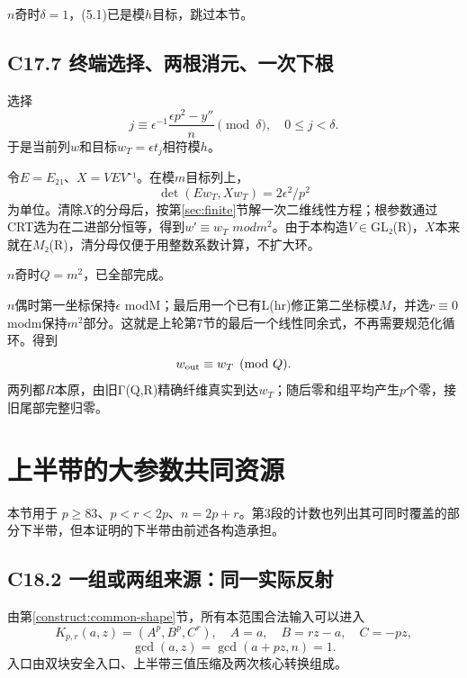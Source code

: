 {\ensuremath{n}奇时\ensuremath{\delta =1}，(5.1)已是模\ensuremath{h}目标，跳过本节。}

\subsection*{\texorpdfstring{{C17.7} {终端选择、两根消元、一次下根}}{C17.7 终端选择、两根消元、一次下根}}\label{C17-h129}

{选择} \[
j\equiv\epsilon^{-1}\frac{\epsilon p^2-y''}{n}\pmod\delta,
\quad0\le j<\delta.
\] {于是当前列\ensuremath{w}和目标\ensuremath{w_{T}=\epsilon t_{j}}相符模\ensuremath{h}。}

{令\ensuremath{E=E}₂₁、\ensuremath{X=VEV}⁻¹。在模\ensuremath{m}目标列上，} \[
\det(Ew_T,Xw_T)=2\epsilon^2/p^2
\] {为单位。清除\ensuremath{X}的分母后，按}第\ref{sec:finite}节{解一次二维线性方程；根参数通过CRT选为在二进部分恒等，得到\ensuremath{w}′\ensuremath{\equiv}\ensuremath{w_{T}}} {\ensuremath{modm^{2}}。由于本构造\ensuremath{V}\ensuremath{\in}GL₂(R)，\ensuremath{X}本来就在\ensuremath{M}₂(R)，清分母仅便于用整数系数计算，不扩大环。}

{\ensuremath{n}奇时\ensuremath{Q=m^{2}}，已全部完成。}

{\ensuremath{n}偶时第一坐标保持\ensuremath{\epsilon }} {modM；最后用一个已有L(hr)修正第二坐标模\ensuremath{M}，并选\ensuremath{r}\ensuremath{\equiv}0} {modm保持\ensuremath{m^{2}}部分。这就是上轮第7节的最后一个线性同余式，不再需要规范化循环。得到} \[
w_{\rm out}\equiv w_T\pmod Q.
\] {两列都\ensuremath{R}本原，由旧Γ(Q,R)精确纤维真实到达\ensuremath{w_{T}}；随后零和组平均产生\ensuremath{p}个零，接旧尾部完整归零。}


\section{上半带的大参数共同资源}\label{construct:common-controller}
{本节用于} \(p\ge83\){、}\(p<r<2p\){、}\(n=2p+r\){。第3段的计数也列出其可同时覆盖的部分下半带，但本证明的下半带由前述各构造承担。}

\subsection*{\texorpdfstring{{C18.2} {一组或两组来源：同一实际反射}}{C18.2 一组或两组来源：同一实际反射}}\label{C18-h130}

{由}第\ref{construct:common-shape}节{，所有本范围合法输入可以进入} \[
K_{p,r}(a,z)=(A^p,B^p,C^r),\quad
A=a,\quad B=rz-a,\quad C=-pz,
\] \[
\gcd(a,z)=\gcd(a+pz,n)=1.
\] {入口由双块安全入口、上半带三值压缩及两次核心转换组成。}

